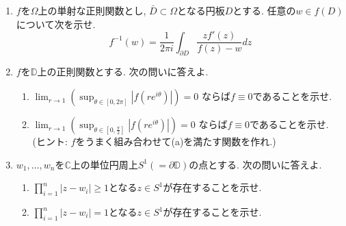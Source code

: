 \documentclass[dvipdfmx,a4paper,11pt]{article}
\newcommand{\C}{\mathbb{C}}
\newcommand{\D}{\mathbb{D}}
\theoremstyle{definition}
\begin{document}
\begin{enumerate}[label=\textbf{問}6.\arabic*]
   \item $f$を$\Omega$上の単射な正則関数とし, $\bar{D} \subset \Omega$となる円板$D$とする. 
   任意の$w \in f(D)$について次を示せ. 
   $$
   f^{-1}(w) = \frac{1}{2 \pi i} \int_{\partial D} \frac{zf'(z)}{f(z) - w} dz
   $$
   
   \item $f$を$\D$上の正則関数とする. 次の問いに答えよ.
     \begin{enumerate}
\setlength{\parskip}{0cm} 
  \setlength{\itemsep}{0cm} 
  \item 
  $
  \lim_{r \to 1} 
  \left(\sup_{ \theta \in [0 , 2 \pi]} |f(r e^{i \theta})| \right) =0
  $
 ならば$f \equiv 0$であることを示せ.
\item     $
  \lim_{r \to 1} 
  \left(\sup_{ \theta \in [0 , \frac{\pi}{2}] } |f(r e^{i \theta})| \right) =0
  $
 ならば$f \equiv 0$であることを示せ. (ヒント: $f$をうまく組み合わせて(a)を満たす関数を作れ.)
        \end{enumerate}  
\item $w_1, \ldots, w_n$を$\C$上の単位円周上$S^1(=\partial \D)$の点とする. 
次の問いに答えよ.
  \begin{enumerate}
\setlength{\parskip}{0cm} 
  \setlength{\itemsep}{0cm} 
\item $\prod_{i=1}^{n} |z - w_i| \ge 1$となる$z \in S^1$が存在することを示せ. 
\item $\prod_{i=1}^{n} |z - w_i|=1$となる$z \in S^1$が存在することを示せ. 
     \end{enumerate}  
     

\end{enumerate}
\end{document}
